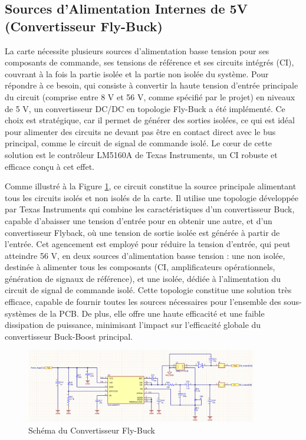 \subsection{Sources d'Alimentation Internes de 5V (Convertisseur Fly-Buck)}

La carte nécessite plusieurs sources d'alimentation basse tension pour ses composants de commande, ses tensions de référence et ses circuits intégrés (CI), couvrant à la fois la partie isolée et la partie non isolée du système. Pour répondre à ce besoin, qui consiste à convertir la haute tension d'entrée principale du circuit (comprise entre 8 V et 56 V, comme spécifié par le projet) en niveaux de 5 V, un convertisseur DC/DC en topologie Fly-Buck a été implémenté. Ce choix est stratégique, car il permet de générer des sorties isolées, ce qui est idéal pour alimenter des circuits ne devant pas être en contact direct avec le bus principal, comme le circuit de signal de commande isolé. Le cœur de cette solution est le contrôleur LM5160A de Texas Instruments, un CI robuste et efficace conçu à cet effet.

Comme illustré à la Figure \ref{fig:flybuck_schematic}, ce circuit constitue la source principale alimentant tous les circuits isolés et non isolés de la carte. Il utilise une topologie développée par Texas Instruments qui combine les caractéristiques d'un convertisseur Buck, capable d'abaisser une tension d'entrée pour en obtenir une autre, et d'un convertisseur Flyback, où une tension de sortie isolée est générée à partir de l'entrée. Cet agencement est employé pour réduire la tension d'entrée, qui peut atteindre 56 V, en deux sources d'alimentation basse tension : une non isolée, destinée à alimenter tous les composants (CI, amplificateurs opérationnels, génération de signaux de référence), et une isolée, dédiée à l'alimentation du circuit de signal de commande isolé. Cette topologie constitue une solution très efficace, capable de fournir toutes les sources nécessaires pour l'ensemble des sous-systèmes de la PCB. De plus, elle offre une haute efficacité et une faible dissipation de puissance, minimisant l'impact sur l'efficacité globale du convertisseur Buck-Boost principal.

\begin{figure}[H]
\centering
\includegraphics[width=0.9\textwidth]{figures/PowerSupply.png}
\caption{Schéma du Convertisseur Fly-Buck}
\label{fig:flybuck_schematic}
\end{figure}

